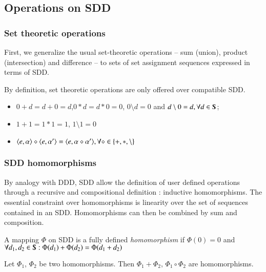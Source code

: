 \subsection{Operations on SDD}

\subsubsection{Set theoretic operations}

First, we generalize the usual set-theoretic operations -- sum
(union), product (intersection) and difference -- to sets of set
assignment sequences expressed in terms of SDD.

\begin{definition}
By definition, set theoretic operations are only offered over
compatible SDD.
\begin{itemize}
\item $0 + d = d + 0 = d$,$0 * d = d * 0 = 0$, $0 \setminus d = 0$ and $d \setminus 0 = d, \forall d \in \SDD$;
\item $1 + 1 = 1 * 1 = 1$, $1 \setminus 1 = 0$
\item $\langle {e,\alpha} \rangle \diamond \langle {e,\alpha'} \rangle = \langle {e,\alpha \diamond \alpha'} \rangle, \forall \diamond \in \{+,*,\setminus\}$ 
\end{itemize}
\end{definition}

\subsubsection{SDD homomorphisms}

By analogy with DDD, SDD allow the definition of user defined
operations through a recursive and compositional definition :
inductive homomorphisms. The essential constraint over homomorphisms
is linearity over the set of sequences contained in an
SDD. Homomorphisms can then be combined by sum and composition.

 \begin{definition}[Homomorphism] A mapping $\Phi$ on SDD is a fully
 defined \emph{homomorphism} if $\Phi(0)=0$ and $\forall d_1,d_2 \in
 \SDD: \Phi(d_1)+\Phi(d_2) = \Phi(d_1+d_2) $
\end{definition}


\begin{proposition}
\label{SDD:prop-hom-operator} Let $\Phi_1$, $\Phi_2$ be two
homomorphisms. Then $\Phi_1 + \Phi_2$, $\Phi_1 \circ \Phi_2$ are
homomorphisms.
\end{proposition}

